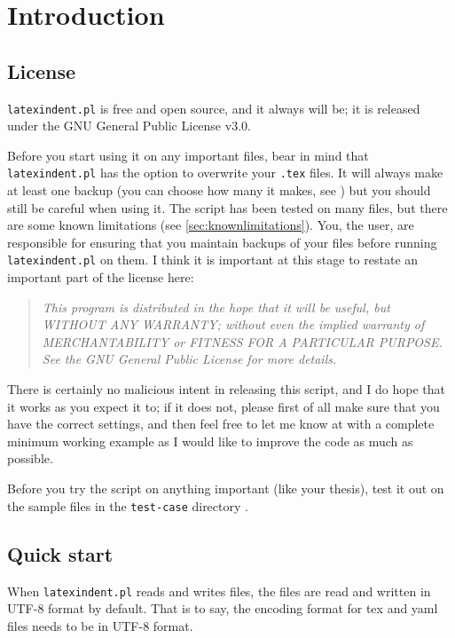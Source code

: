 \section{Introduction}

\subsection{License}
 \texttt{latexindent.pl} is free and open source, and it always will be; it
 is released under the GNU General Public License v3.0.

 Before you start using it on any important files, bear in mind that
 \texttt{latexindent.pl} has the option to overwrite your \texttt{.tex} files. It will
 always make at least one backup (you can choose how many it makes, see
 ) but you should still be careful when using it. The script
 has been tested on many files, but there are some known limitations (see
 \cref{sec:knownlimitations}). You, the user, are responsible for ensuring that you
 maintain backups of your files before running \texttt{latexindent.pl} on them. I think
 it is important at this stage to restate an important part of the license here:
 \begin{quote}\itshape
  This program is distributed in the hope that it will be useful,
  but WITHOUT ANY WARRANTY; without even the implied warranty of
  MERCHANTABILITY or FITNESS FOR A PARTICULAR PURPOSE. See the
  GNU General Public License for more details.
 \end{quote}
 There is certainly no malicious intent in releasing this script, and I do hope that it
 works as you expect it to; if it does not, please first of all make sure that you have
 the correct settings, and then feel free to let me know at \cite{latexindent-home} with
 a complete minimum working example as I would like to improve the code as much as
 possible.

 \begin{warning}
  Before you try the script on anything important (like your thesis), test it out on the
  sample files in the \texttt{test-case} directory \cite{latexindent-home}.
 \end{warning}

\subsection{Quick start}\label{sec:quickstart}
 When \texttt{latexindent.pl} reads and writes files, the files are read and written in UTF-8 format by default.
 That is to say, the encoding format for tex and yaml files needs to be in UTF-8 format.

